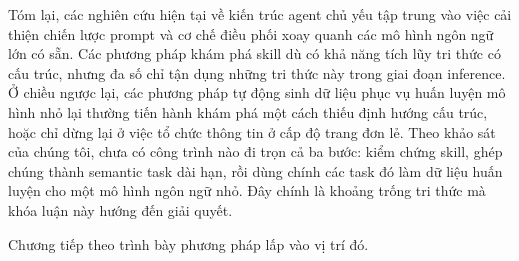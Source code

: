 Tóm lại, các nghiên cứu hiện tại về kiến trúc agent chủ yếu tập trung vào việc cải thiện chiến lược prompt và cơ chế điều phối xoay quanh các mô hình ngôn ngữ lớn có sẵn. Các phương pháp khám phá skill dù có khả năng tích lũy tri thức có cấu trúc, nhưng đa số chỉ tận dụng những tri thức này trong giai đoạn inference. Ở chiều ngược lại, các phương pháp tự động sinh dữ liệu phục vụ huấn luyện mô hình nhỏ lại thường tiến hành khám phá một cách thiếu định hướng cấu trúc, hoặc chỉ dừng lại ở việc tổ chức thông tin ở cấp độ trang đơn lẻ. Theo khảo sát của chúng tôi, chưa có công trình nào đi trọn cả ba bước: kiểm chứng skill, ghép chúng thành semantic task dài hạn, rồi dùng chính các task đó làm dữ liệu huấn luyện cho một mô hình ngôn ngữ nhỏ. Đây chính là khoảng trống tri thức mà khóa luận này hướng đến giải quyết.

\vspace{1em}
\noindent
Chương tiếp theo trình bày phương pháp lấp vào vị trí đó.
